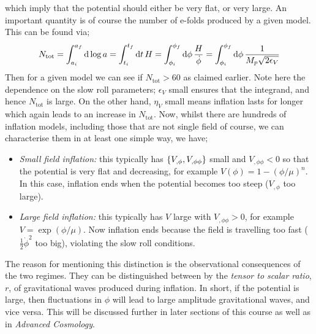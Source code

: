 which imply that the potential should either be very flat, or very large. An important quantity is of course the number of e-folds produced by a given model. This can be found via;
\begin{equation*}
N_{\text{tot}} = \int_{a_i}^{a_f}{\text{d} \log a} = \int_{t_i}^{t_f}{\text{d}t \, H} = \int_{\phi_i}^{\phi_f}{\text{d}\phi \, \frac{H}{\dot{\phi}}} = \int_{\phi_i}^{\phi_f}{\text{d}\phi \,\frac{1}{M_p\sqrt{2\epsilon_V}}}
\end{equation*}
Then for a given model we can see if $N_{\text{tot}} > 60$ as claimed earlier. Note here the dependence on the slow roll parameters; $\epsilon_V$ small ensures that the integrand, and hence $N_{\text{tot}}$ is large. On the other hand, $\eta_{V}$ small means inflation lasts for longer which again leads to an increase in $N_{\text{tot}}$. Now, whilst there are hundreds of inflation models, including those that are not single field of course, we can characterise them in at least one simple way, we have;
\begin{itemize}
\item \emph{Small field inflation:} this typically has $\set{V_{, \phi}, V_{, \phi\phi}}$ small and $V_{, \phi\phi} < 0$ so that the potential is very flat and decreasing, for example $V(\phi) = 1 - (\phi/\mu)^n$. In this case, inflation ends when the potential becomes too steep ($V_{, \phi}$ too large). 
\item \emph{Large field inflation:} this typically has $V$ large with $V_{, \phi\phi} > 0$, for example $V = \exp(\phi/\mu)$. Now inflation ends because the field is travelling too fast ($\tfrac{1}{2}\dot{\phi}^2$ too big), violating the slow roll conditions. 
\end{itemize}
The reason for mentioning this distinction is the observational consequences of the two regimes. They can be distinguished between by the \emph{tensor to scalar ratio}, $r$, of gravitational waves produced during inflation. In short, if the potential is large, then fluctuations in $\phi$ will lead to large amplitude gravitational waves, and vice versa. This will be discussed further in later sections of this course as well as in \emph{Advanced Cosmology}. 

